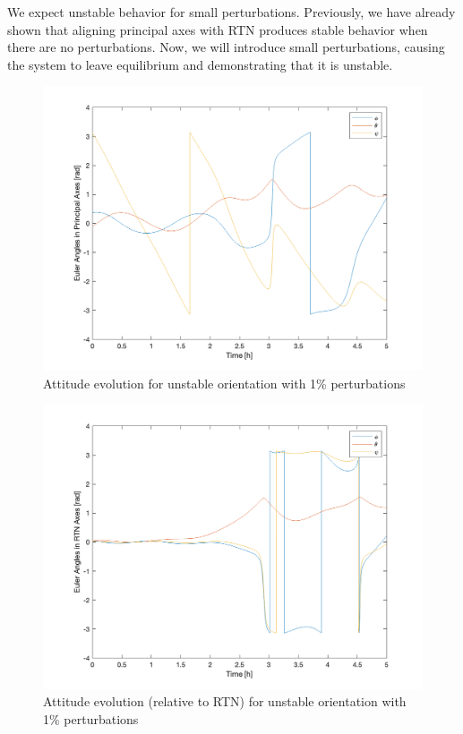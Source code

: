 We expect unstable behavior for small perturbations. Previously, we have already shown that aligning principal axes with RTN produces stable behavior when there are no perturbations. Now, we will introduce small perturbations, causing the system to leave equilibrium and demonstrating that it is unstable.

\begin{figure}[H]
\centering
\includegraphics[scale=0.6]{Images/ps5_problem1b_angle.png}
\caption{Attitude evolution for unstable orientation with 1\% perturbations}
\label{fig:ps5_problem1b_angle}
\end{figure}

\begin{figure}[H]
\centering
\includegraphics[scale=0.6]{Images/ps5_problem1b_angle_rtn.png}
\caption{Attitude evolution (relative to RTN) for unstable orientation with 1\% perturbations}
\label{fig:ps5_problem1b_angle_rtn}
\end{figure}

